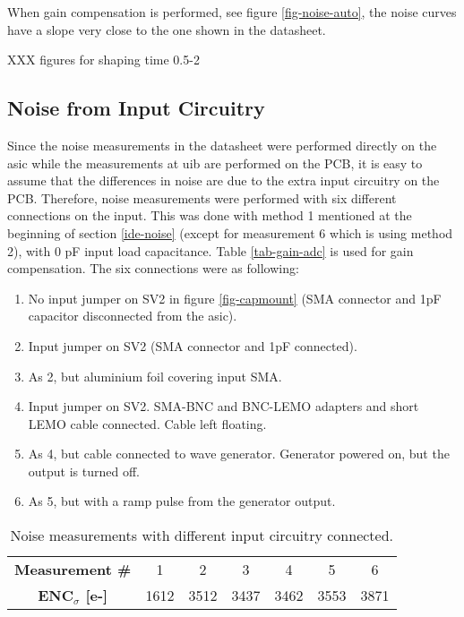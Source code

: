 \documentclass[../main/thesis.tex]{subfiles}
\begin{document}
When gain compensation is performed, see figure \ref{fig-noise-auto}, the noise curves have a slope very close to the one shown in the datasheet. 

XXX figures for shaping time 0.5-2




\subsection{Noise from Input Circuitry}
\label{ide-noise-input}

Since the noise measurements in the datasheet were performed directly on the \gls{asic} while the measurements at \gls{uib} are performed on the \gls{PCB}, it is easy to assume that the differences in noise are due to the extra input circuitry on the \gls{PCB}. Therefore, noise measurements were performed with six different connections on the input. This was done with method 1 mentioned at the beginning of section \ref{ide-noise} (except for measurement 6 which is using method 2), with 0 pF input load capacitance. Table \ref{tab-gain-adc} is used for gain compensation. The six connections were as following:
\begin{enumerate}  
	\item No input jumper on SV2 in figure \ref{fig-capmount} (SMA connector and 1pF capacitor disconnected from the \gls{asic}).
	\item Input jumper on SV2 (SMA connector and 1pF connected).
	\item As 2, but aluminium foil covering input SMA.
	\item Input jumper on SV2. SMA-BNC and BNC-LEMO adapters and short LEMO cable connected. Cable left floating.
	\item As 4, but cable connected to wave generator. Generator powered on, but the output is turned off.
	\item As 5, but with a ramp pulse from the generator output.   
\end{enumerate}

\begin{table}[h!]
	\begin{center}
		\caption{Noise measurements with different input circuitry connected.}
		\label{tab-noise-input}
		\begin{tabular}{ccccccc}\toprule
			\textbf{Measurement \#}      & 1    & 2    & 3    & 4    & 5    & 6   \\ 
			\textbf{ENC$_\sigma$ [e-]} & 1612 & 3512 & 3437 & 3462 & 3553 & 3871   \\ \bottomrule
		\end{tabular}
	\end{center}
\end{table}
\end{document}
